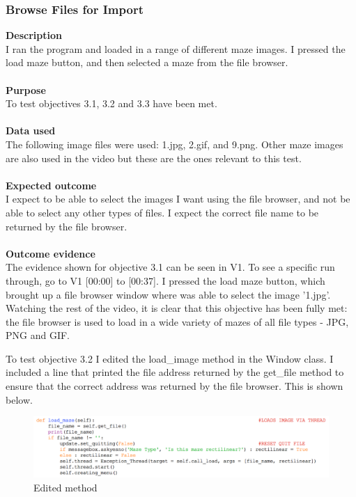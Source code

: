 \documentclass[titlepage]{article}
\begin{document}
\subsubsection{Browse Files for Import}
\textbf{Description}\\
I ran the program and loaded in a range of different maze images. I pressed the load maze button, and then selected a maze from the file browser. \\\\
\textbf{Purpose}\\
To test objectives 3.1, 3.2 and 3.3 have been met.\\\\
\textbf{Data used} \\
The following image files were used: 1.jpg, 2.gif, and 9.png. Other maze images are also used in the video but these are the ones relevant to this test.\\\\
\textbf{Expected outcome}\\
I expect to be able to select the images I want using the file browser, and not be able to select any other types of files. I expect the correct file name to be returned by the file browser.\\\\
\textbf{Outcome evidence}\\
The evidence shown for objective 3.1 can be seen in V1. To see a specific run through, go to V1 [00:00] to [00:37]. I pressed the load maze button, which brought up a file browser window where was able to select the image '1.jpg'. Watching the rest of the video, it is clear that this objective has been fully met: the file browser is used to load in a wide variety of mazes of all file types - JPG, PNG and GIF. 

To test objective 3.2 I edited the load\_image method in the Window class. I included a line that printed the file address returned by the get\_file method to ensure that the correct address was returned by the file browser. This is shown below.

\begin{figure}[H]
  \centering
  \includegraphics[width=12cm]{321.png}
  \caption{Edited method}
  \label{fig:dijk}
\end{figure}
\end{document}
